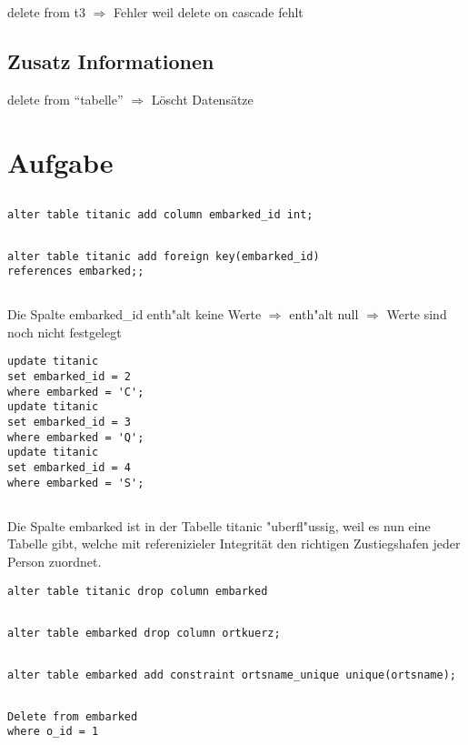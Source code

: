 \documentclass[a4paper, 11pt, titlepage]{article}
\begin{document}
\subsection{}
delete from t3 $\Rightarrow$ Fehler weil delete on cascade fehlt
\subsection{Zusatz Informationen}
delete from "`tabelle"' $\Rightarrow$ Löscht Datensätze
\section{Aufgabe}
\subsection{}
\begin{verbatim}
alter table titanic add column embarked_id int;
\end{verbatim}
\subsection{}
\begin{verbatim}
alter table titanic add foreign key(embarked_id) 
references embarked;;
\end{verbatim}
\subsection{}
Die Spalte embarked\_id enth"alt keine Werte $\Rightarrow$ enth"alt null $\Rightarrow$ Werte sind noch nicht festgelegt
\begin{verbatim}
update titanic
set embarked_id = 2
where embarked = 'C';
update titanic
set embarked_id = 3
where embarked = 'Q';
update titanic
set embarked_id = 4
where embarked = 'S';
\end{verbatim}
\subsection{}
Die Spalte embarked ist in der Tabelle titanic "uberfl"ussig, weil es nun eine Tabelle gibt, welche mit referenizieler Integrität den richtigen Zustiegshafen jeder Person zuordnet.
\begin{verbatim}
alter table titanic drop column embarked
\end{verbatim}
\subsection{}
\begin{verbatim}
alter table embarked drop column ortkuerz;
\end{verbatim}
\subsection{}
\begin{verbatim}
alter table embarked add constraint ortsname_unique unique(ortsname);
\end{verbatim}
\subsection{}
\begin{verbatim}
Delete from embarked
where o_id = 1
\end{verbatim}
\end{document}
